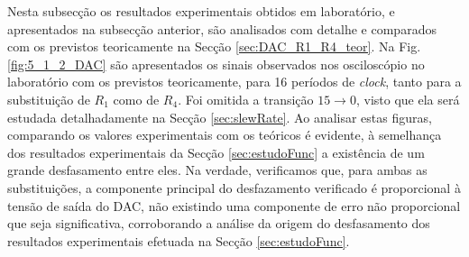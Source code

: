 \documentclass[a4paper, oneside]{article}
\begin{document}
Nesta subsecção os resultados experimentais obtidos em laboratório, e apresentados na subsecção anterior, são analisados com detalhe e comparados com os previstos teoricamente na Secção \ref{sec:DAC_R1_R4_teor}. Na Fig. \ref{fig:5_1_2_DAC} são apresentados os sinais observados nos osciloscópio no laboratório com os previstos teoricamente, para 16 períodos de \textit{clock}, tanto para a substituição de $R_1$ como de $R_4$. Foi omitida a transição $15\rightarrow 0$, visto que ela será estudada detalhadamente na Secção \ref{sec:slewRate}. Ao analisar estas figuras, comparando os valores experimentais com os teóricos é evidente, à semelhança dos resultados experimentais da Secção \ref{sec:estudoFunc}  a existência de um grande desfasamento entre eles. Na verdade, verificamos que, para ambas as substituições, a componente principal do desfazamento verificado é proporcional à tensão de saída do DAC, não existindo uma componente de erro não proporcional que seja significativa, corroborando a análise da origem do desfasamento dos resultados experimentais efetuada na Secção \ref{sec:estudoFunc}.
\end{document}

